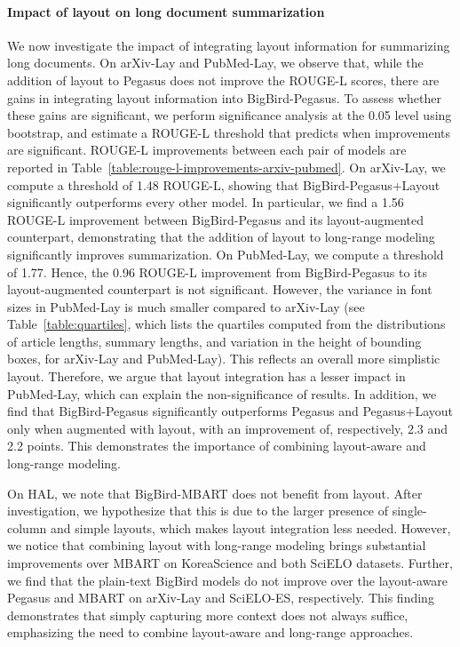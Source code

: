 \paragraph{Impact of layout on long document summarization} We now investigate the impact of integrating layout information for summarizing long documents. On arXiv-Lay and PubMed-Lay, we observe that, while the addition of layout to Pegasus does not improve the ROUGE-L scores, there are gains in integrating layout information into BigBird-Pegasus. To assess whether these gains are significant, we perform significance analysis at the 0.05 level using bootstrap, and estimate a ROUGE-L threshold that predicts when improvements are significant. ROUGE-L improvements between each pair of models are reported in Table~\ref{table:rouge-l-improvements-arxiv-pubmed}. On arXiv-Lay, we compute a threshold of 1.48 ROUGE-L, showing that BigBird-Pegasus+Layout significantly outperforms every other model. In particular, we find a 1.56 ROUGE-L improvement between BigBird-Pegasus and its layout-augmented counterpart, demonstrating that the addition of layout to long-range modeling significantly improves summarization. On PubMed-Lay, we compute a threshold of 1.77. Hence, the 0.96 ROUGE-L improvement from BigBird-Pegasus to its layout-augmented counterpart is not significant. However, the variance in font sizes in PubMed-Lay is much smaller compared to arXiv-Lay (see Table~\ref{table:quartiles}, which lists the quartiles computed from the distributions of article lengths, summary lengths, and variation in the height of bounding boxes, for arXiv-Lay and PubMed-Lay). This reflects an overall more simplistic layout. Therefore, we argue that layout integration has a lesser impact in PubMed-Lay, which can explain the non-significance of results. In addition, we find that BigBird-Pegasus significantly outperforms Pegasus and Pegasus+Layout only when augmented with layout, with an improvement of, respectively, 2.3 and 2.2 points. This demonstrates the importance of combining layout-aware and long-range modeling. 

On HAL, we note that BigBird-MBART does not benefit from layout. After investigation, we hypothesize that this is due to the larger presence of single-column and simple layouts, which makes layout integration less needed. However, we notice that combining layout with long-range modeling brings substantial improvements over MBART on KoreaScience and both SciELO datasets. Further, we find that the plain-text BigBird models do not improve over the layout-aware Pegasus and MBART on arXiv-Lay and SciELO-ES, respectively. This finding demonstrates that simply capturing more context does not always suffice, emphasizing the need to combine layout-aware and long-range approaches. 

